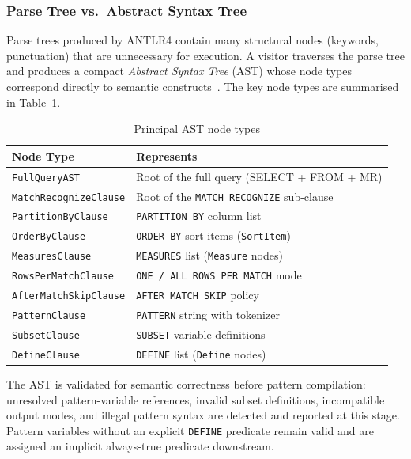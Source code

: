 \subsubsection{Parse Tree vs.\ Abstract Syntax Tree}
\label{subsubsec:meth-ast}

Parse trees produced by ANTLR4 contain many structural nodes
(keywords, punctuation) that are unnecessary for execution.  A
visitor traverses the parse tree and produces a compact
\emph{Abstract Syntax Tree} (AST) whose node types correspond
directly to semantic constructs~\cite{DragonBook,jones2003ast}.  The key node
types are summarised in Table~\ref{tab:meth-ast-nodes}.

\begin{table}[htbp]
  \centering
  \caption{Principal AST node types}
  \label{tab:meth-ast-nodes}
  \begin{tabular}{ll}
    \toprule
    \textbf{Node Type}                  & \textbf{Represents} \\
    \midrule
    \texttt{FullQueryAST}               & Root of the full query (SELECT + FROM + MR) \\
    \texttt{MatchRecognizeClause}        & Root of the \texttt{MATCH\_RECOGNIZE} sub-clause \\
    \texttt{PartitionByClause}           & \texttt{PARTITION BY} column list \\
    \texttt{OrderByClause}              & \texttt{ORDER BY} sort items (\texttt{SortItem}) \\
    \texttt{MeasuresClause}             & \texttt{MEASURES} list (\texttt{Measure} nodes) \\
    \texttt{RowsPerMatchClause}          & \texttt{ONE / ALL ROWS PER MATCH} mode \\
    \texttt{AfterMatchSkipClause}        & \texttt{AFTER MATCH SKIP} policy \\
    \texttt{PatternClause}              & \texttt{PATTERN} string with tokenizer \\
    \texttt{SubsetClause}               & \texttt{SUBSET} variable definitions \\
    \texttt{DefineClause}               & \texttt{DEFINE} list (\texttt{Define} nodes) \\
    \bottomrule
  \end{tabular}
\end{table}

The AST is validated for semantic correctness before pattern
compilation: unresolved pattern-variable references, invalid subset
definitions, incompatible output modes, and illegal pattern syntax are
detected and reported at this stage.  Pattern variables without an
explicit \texttt{DEFINE} predicate remain valid and are assigned an
implicit always-true predicate downstream.

